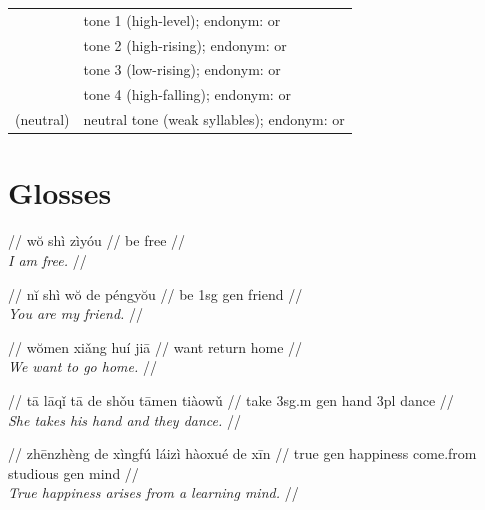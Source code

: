 \documentclass{article}
\begin{document}
\begin{xltabular}{\textwidth}{lL}
   & tone 1 (high-level); endonym:  or  \\
   & tone 2 (high-rising); endonym:  or  \\
   & tone 3 (low-rising); endonym:  or  \\
   & tone 4 (high-falling); endonym:  or  \\
  (neutral) & neutral tone (weak syllables); endonym:  or  \\
\end{xltabular}

\newpage\section{Glosses}

\ex
\begingl
\gla {}   //
\glb w\u{o} sh\`{i} z\`{i}y\'{o}u //
 be free //
\\\textit{I am free.} //
\endgl
\xe

\ex
\begingl
\gla {}     //
\glb n\u{i} sh\`{i} w\u{o} de p\'{e}ngy\u{o}u //
 be {\sc 1sg} {\sc gen} friend //
\\\textit{You are my friend.} //
\endgl
\xe

\ex
\begingl
\gla {}    //
\glb w\u{o}men xi\v{a}ng hu\'{i} ji\=a //
 want return home //
\\\textit{We want to go home.} //
\endgl
\xe

\ex
\begingl
\gla {}       //
\glb t\=a l\=aq\v{i} t\=a de sh\v{o}u t\=amen ti\`{a}ow\v{u} //
 take {\sc 3sg.m} {\sc gen} hand {\sc 3pl} dance //
\\\textit{She takes his hand and they dance.} //
\endgl
\xe

\ex
\begingl
\gla {}       //
\glb zh\=enzh\`{e}ng de x\`{i}ngf\'{u} l\'{a}iz\`{i} h\`{a}oxu\'{e} de x\=in //
\glc true {\sc gen} happiness come.from studious {\sc gen} mind //
\\\textit{True happiness arises from a learning mind.} //
\endgl
\xe
\end{document}
